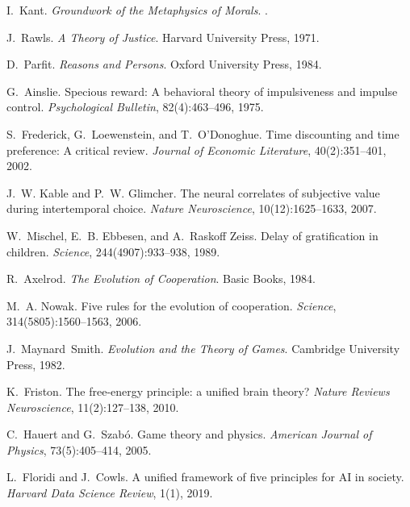 \documentclass[11pt]{article}
\begin{document}
\begin{thebibliography}{99}

I.~Kant.
\newblock \emph{Groundwork of the Metaphysics of Morals}.
.

J.~Rawls.
\newblock \emph{A Theory of Justice}.
\newblock Harvard University Press, 1971.

D.~Parfit.
\newblock \emph{Reasons and Persons}.
\newblock Oxford University Press, 1984.

G.~Ainslie.
\newblock Specious reward: A behavioral theory of impulsiveness and impulse control.
\newblock \emph{Psychological Bulletin}, 82(4):463--496, 1975.

S.~Frederick, G.~Loewenstein, and T.~O'Donoghue.
\newblock Time discounting and time preference: A critical review.
\newblock \emph{Journal of Economic Literature}, 40(2):351--401, 2002.

J.~W. Kable and P.~W. Glimcher.
\newblock The neural correlates of subjective value during intertemporal choice.
\newblock \emph{Nature Neuroscience}, 10(12):1625--1633, 2007.

W.~Mischel, E.~B. Ebbesen, and A.~Raskoff Zeiss.
\newblock Delay of gratification in children.
\newblock \emph{Science}, 244(4907):933--938, 1989.

R.~Axelrod.
\newblock \emph{The Evolution of Cooperation}.
\newblock Basic Books, 1984.

M.~A. Nowak.
\newblock Five rules for the evolution of cooperation.
\newblock \emph{Science}, 314(5805):1560--1563, 2006.

J.~Maynard~Smith.
\newblock \emph{Evolution and the Theory of Games}.
\newblock Cambridge University Press, 1982.

K.~Friston.
\newblock The free-energy principle: a unified brain theory?
\newblock \emph{Nature Reviews Neuroscience}, 11(2):127--138, 2010.

C.~Hauert and G.~Szab{\'o}.
\newblock Game theory and physics.
\newblock \emph{American Journal of Physics}, 73(5):405--414, 2005.

L.~Floridi and J.~Cowls.
\newblock A unified framework of five principles for AI in society.
\newblock \emph{Harvard Data Science Review}, 1(1), 2019.


\end{thebibliography}
\end{document}
